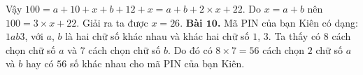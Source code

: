 \begin{multicols}{2}
\begin{figure}[H]
		\vspace*{-10pt}
	\end{figure}
	Vậy $100 = a + 10 + x + b + 12 + x = a + b + 2×x + 22$.
	\vskip 0.1cm
	Do $x = a + b$ nên $100 = 3\times x + 22$.
	\vskip 0.1cm
	Giải ra ta được $x = 26$.
	\vskip 0.1cm
	\textbf{Bài $\pmb{10}$.} Mã PIN của bạn Kiên có dạng: $1ab3$, với $a$, $b$ là hai chữ số khác nhau và khác hai chữ số $1$, $3$.
	\vskip 0.1cm
	Ta thấy có $8$ cách chọn chữ số $a$ và $7$ cách chọn chữ số $b$.
	\vskip 0.1cm
	Do đó có $8\times 7 = 56$ cách chọn $2$ chữ số $a$ và $b$ hay có $56$ số khác nhau cho mã PIN của bạn Kiên.
\end{multicols}
